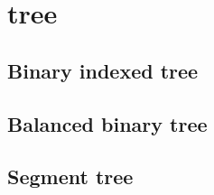 \section{tree}
\subsection{Binary indexed tree}
\subsection{Balanced binary tree}
\subsection{Segment tree}
